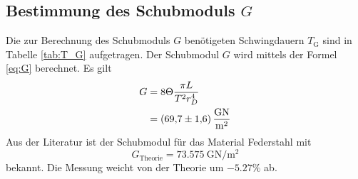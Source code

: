 \subsection{Bestimmung des Schubmoduls \texorpdfstring{$G$}{G}}

Die zur Berechnung des Schubmoduls $G$ benötigeten Schwingdauern $T_\text{G}$ sind in Tabelle \ref{tab:T_G} aufgetragen.
Der Schubmodul $G$ wird mittels der Formel \eqref{eq:G} berechnet.
Es gilt
\begin{align}
	G 	&=  8 \Theta\frac{\pi L}{T^2 r_D^4}\\%
		&=	\SI{69.7\pm1.6}{\giga\newton\per\meter\squared}
	\label{eq:schubmodul}
	\end{align}
Aus der Literatur ist der Schubmodul für das Material Federstahl mit
\begin{equation}
	G_\text{Theorie} = \SI{73.575}{\giga\newton\per\meter\squared}
\end{equation}bekannt.
Die Messung weicht von der Theorie um $-5.27\%$ ab.
